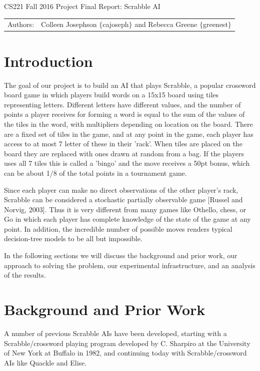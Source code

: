\documentclass[12pt]{article}
\begin{document}
\begin{center}
{\Large CS221 Fall 2016 Project Final Report: Scrabble AI}

\begin{tabular}{rl}
  Authors: & Colleen Josephson $\{$cajoseph$\}$ and Rebecca Greene $\{$greenest$\}$\\
\end{tabular}
\end{center}


\section*{Introduction}
The goal of our project is to build an AI that plays Scrabble, a
popular crossword board game in which players build words on a 15x15
board using tiles representing letters. Different letters have
different values, and the number of points a player receives for
forming a word is equal to the sum of the values of the tiles in the
word, with multipliers depending on location on the board. There are a
fixed set of tiles in the game, and at any point in the game, each
player has access to at most 7 letter of these in their 'rack'.  When
tiles are placed on the board they are replaced with ones drawn at
random from a bag. If the players uses all 7 tiles this is called a
'bingo' and the move receives a 50pt bonus, which can be about 1/8 of
the total points in a tournament game.

Since each player can make no direct observations of the other
player's rack, Scrabble can be considered a stochastic partially
observable game [Russel and Norvig, 2003]. Thus it is very different
from many games like Othello, chess, or Go in which each player has
complete knowledge of the state of the game at any point. In addition,
the incredible number of possible moves renders typical decision-tree
models to be all but impossible.

In the following sections we will discuss the background and prior
work, our approach to solving the problem, our experimental
infrastructure, and an analysis of the results.\\

\section*{Background and Prior Work}

A number of previous Scrabble AIs have been developed, starting with a
Scrabble/crossword playing program developed by C. Sharpiro at the
University of New York at Buffalo in 1982, and continuing today with
Scrabble/crossword AIs like Quackle and Elise.
\end{document}
